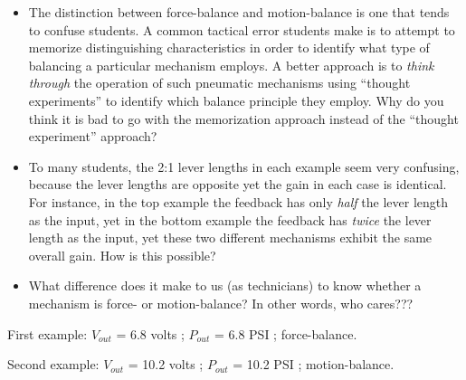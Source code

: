 \begin{itemize}
\item{} The distinction between force-balance and motion-balance is one that tends to confuse students.  A common tactical error students make is to attempt to memorize distinguishing characteristics in order to identify what type of balancing a particular mechanism employs.  A better approach is to {\it think through} the operation of such pneumatic mechanisms using ``thought experiments'' to identify which balance principle they employ.  Why do you think it is bad to go with the memorization approach instead of the ``thought experiment'' approach?
\item{} To many students, the 2:1 lever lengths in each example seem very confusing, because the lever lengths are opposite yet the gain in each case is identical.  For instance, in the top example the feedback has only {\it half} the lever length as the input, yet in the bottom example the feedback has {\it twice} the lever length as the input, yet these two different mechanisms exhibit the same overall gain.  How is this possible?
\item{} What difference does it make to us (as technicians) to know whether a mechanism is force- or motion-balance?  In other words, who cares???
\end{itemize}







First example: $V_{out}$ = 6.8 volts ; $P_{out}$ = 6.8 PSI ; force-balance.

\vskip 10pt

Second example: $V_{out}$ = 10.2 volts ; $P_{out}$ = 10.2 PSI ; motion-balance.











